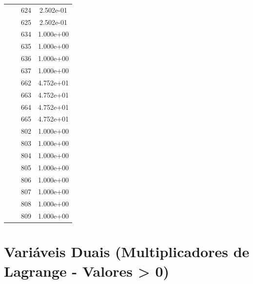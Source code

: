 \documentclass[12pt]{article}
\begin{document}
\begin{longtable}{@{}cccc@{}}
 &  & 624 & 2.502e-01 \\
 &  & 625 & 2.502e-01 \\
 &  & 634 & 1.000e+00 \\
 &  & 635 & 1.000e+00 \\
 &  & 636 & 1.000e+00 \\
 &  & 637 & 1.000e+00 \\
 &  & 662 & 4.752e+01 \\
 &  & 663 & 4.752e+01 \\
 &  & 664 & 4.752e+01 \\
 &  & 665 & 4.752e+01 \\
 &  & 802 & 1.000e+00 \\
 &  & 803 & 1.000e+00 \\
 &  & 804 & 1.000e+00 \\
 &  & 805 & 1.000e+00 \\
 &  & 806 & 1.000e+00 \\
 &  & 807 & 1.000e+00 \\
 &  & 808 & 1.000e+00 \\
 &  & 809 & 1.000e+00 \\

\bottomrule
\end{longtable}


\section{Variáveis Duais (Multiplicadores de Lagrange - Valores > 0)}
\end{document}

